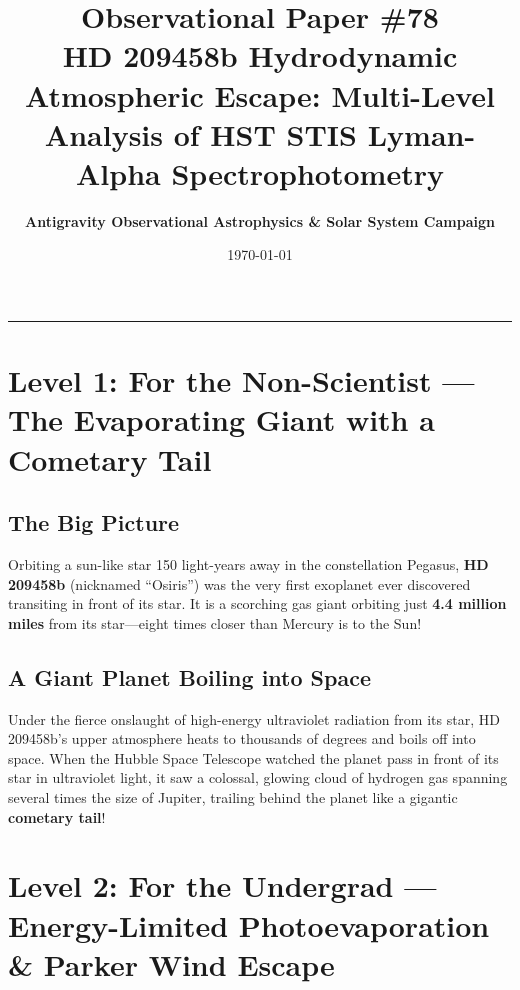 \documentclass[11pt,a4paper]{article}
\title{\Huge \textbf{Observational Paper \#78}\\ \Large HD 209458b Hydrodynamic Atmospheric Escape: Multi-Level Analysis of HST STIS Lyman-Alpha Spectrophotometry}
\author{\textbf{Antigravity Observational Astrophysics \& Solar System Campaign}}
\date{\today}
\begin{document}
\maketitle

\vspace{-1em}
\begin{center}
\rule{\textwidth}{1.5pt}
\end{center}

\section*{Level 1: For the Non-Scientist — The Evaporating Giant with a Cometary Tail}

\subsection*{The Big Picture}
Orbiting a sun-like star 150 light-years away in the constellation Pegasus, \textbf{HD 209458b} (nicknamed ``Osiris'') was the very first exoplanet ever discovered transiting in front of its star. It is a scorching gas giant orbiting just \textbf{4.4 million miles} from its star—eight times closer than Mercury is to the Sun!

\subsection*{A Giant Planet Boiling into Space}
Under the fierce onslaught of high-energy ultraviolet radiation from its star, HD 209458b's upper atmosphere heats to thousands of degrees and boils off into space. When the Hubble Space Telescope watched the planet pass in front of its star in ultraviolet light, it saw a colossal, glowing cloud of hydrogen gas spanning several times the size of Jupiter, trailing behind the planet like a gigantic \textbf{cometary tail}!

\newpage

\section*{Level 2: For the Undergrad — Energy-Limited Photoevaporation \& Parker Wind Escape}
\end{document}
